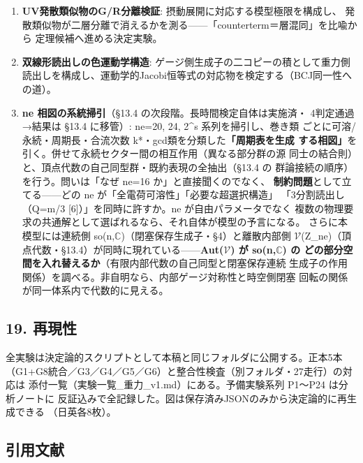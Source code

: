 \documentclass[
]{ltjarticle}
\begin{document}
\begin{enumerate}
  \textbf{実テクスチャ海での統合再検証}: 実海の上で柱G3〜G6を再測する。
\item
  \textbf{UV発散類似物のG/R分離検証}:
  摂動展開に対応する模型極限を構成し、
  発散類似物が二層分離で消えるかを測る------「counterterm＝層混同」を比喩から
  定理候補へ進める決定実験。
\item
  \textbf{双線形読出しの色運動学構造}:
  ゲージ側生成子の二コピーの積として重力側
  読出しを構成し、運動学的Jacobi恒等式の対応物を検定する（BCJ同一性への道）。
\item
  \textbf{ne 相図の系統掃引}（§13.4 の次段階。長時間検定自体は実施済・
  4判定通過→結果は §13.4 に移管）: ne=20, 24, 2\^{}s
  系列を掃引し、巻き類 ごとに可溶/永続・周期長・合流次数
  k*・gcd類を分類した\textbf{「周期表を生成
  する相図」}を引く。併せて永続セクター間の相互作用（異なる部分群の源
  同士の結合則）と、頂点代数の自己同型群・既約表現の全抽出（§13.4 の
  群論接続の順序）を行う。問いは「なぜ ne=16 か」と直接聞くのでなく、
  \textbf{制約問題}として立てる------どの ne
  が「全電荷可溶性」「必要な超選択構造」 「3分割読出し（Q=m/3
  {[}6{]}）」を同時に許すか。ne が自由パラメータでなく
  複数の物理要求の共通解として選ばれるなら、それ自体が模型の予言になる。
  さらに本模型には連続側
  so(n,\(\mathbb{C}\))（閉塞保存生成子・§4）と離散内部側
  \(\mathcal{V}\)(Z\_ne)（頂点代数・§13.4）が同時に現れている------\textbf{Aut(\(\mathcal{V}\))
  が so(n,\(\mathbb{C}\)) の
  どの部分空間を入れ替えるか}（有限内部代数の自己同型と閉塞保存連続
  生成子の作用関係）を調べる。非自明なら、内部ゲージ対称性と時空側閉塞
  回転の関係が同一体系内で代数的に見える。
\end{enumerate}

\subsection{19. 再現性}\label{ux518dux73feux6027}

全実験は決定論的スクリプトとして本稿と同じフォルダに公開する。正本5本
（G1+G8統合／G3／G4／G5／G6）と整合性検査（別フォルダ・27走行）の対応は
添付一覧（実験一覧\_重力\_v1.md）にある。予備実験系列 P1〜P24
は分析ノートに
反証込みで全記録した。図は保存済みJSONのみから決定論的に再生成できる
（日英各8枚）。

\subsection{引用文献}\label{ux5f15ux7528ux6587ux732e}
\end{document}
